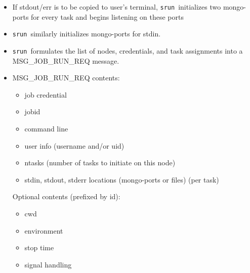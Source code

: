 \documentclass[article,letter,landscape]{seminar}
\newcommand{\srun}{{\tt srun}}
\begin{document}
\begin{slide}
  \begin{center}
  \begin{itemize}
    \item If stdout/err is to be copied to user's terminal, \srun\ initializes
          two mongo-ports for every task and begins listening on these ports
    \item \srun\ similarly initializes mongo-ports for stdin.
    \item \srun\ formulates the list of nodes, credentials, and task
          assignments into a MSG\_JOB\_RUN\_REQ message.
 \end{itemize}
  \end{center}
\end{slide}

\begin{slide}
  \begin{center}
  \begin{itemize}
   \item MSG\_JOB\_RUN\_REQ contents:
     \begin{itemize}
      \item job credential
      \item jobid
      \item command line
      \item user info (username and/or uid)
      \item ntasks (number of tasks to initiate on this node)
      \item stdin, stdout, stderr locations (mongo-ports or files)
            (per task)
    \end{itemize}
    Optional contents (prefixed by id):
    \begin{itemize}
      \item cwd
      \item environment
      \item stop time
      \item signal handling
    \end{itemize}
    \end{itemize}
  \end{center}
\end{slide}
\end{document}
